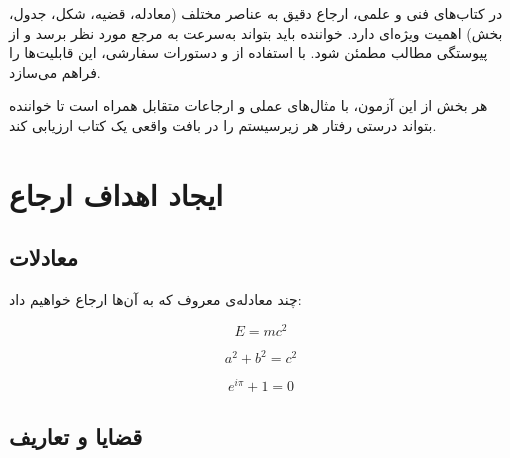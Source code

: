 \documentclass{matinbook}
\begin{document}
در کتاب‌های فنی و علمی، ارجاع دقیق به عناصر مختلف
(معادله، قضیه، شکل، جدول، بخش) اهمیت ویژه‌ای دارد.
خواننده باید بتواند به‌سرعت به مرجع مورد نظر برسد و
از پیوستگی مطالب مطمئن شود.  با
استفاده از  و دستورات سفارشی، این
قابلیت‌ها را فراهم می‌سازد.

هر بخش از این آزمون، با مثال‌های عملی و ارجاعات متقابل
همراه است تا خواننده بتواند درستی رفتار هر زیرسیستم را
در بافت واقعی یک کتاب ارزیابی کند.

\clearpage

\tableofcontents
\clearpage

\listoffigures
\clearpage

\listoftables
\clearpage

\mainmatter
\mainmattergeometry

\chapter{ایجاد اهداف ارجاع}
\label{chap:targets}

\section{معادلات}
\label{sec:targets-equations}

چند معادله‌ی معروف که به آن‌ها ارجاع خواهیم داد:

\begin{equation}
    E = mc^{2}
    \label{eq:einstein}
\end{equation}

\begin{equation}
    a^{2} + b^{2} = c^{2}
    \label{eq:pythagoras}
\end{equation}

\begin{equation}
    e^{i\pi} + 1 = 0
    \label{eq:euler}
\end{equation}


\section{قضایا و تعاریف}
\label{sec:targets-theorems}
\end{document}
